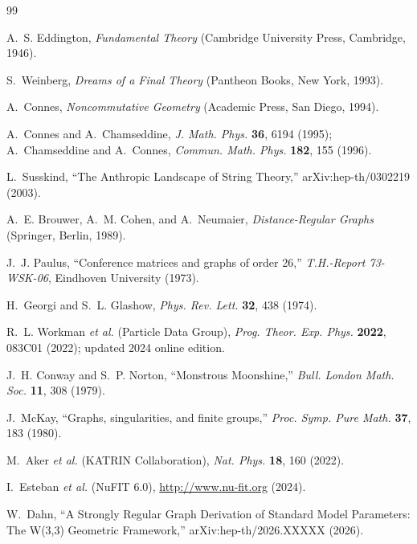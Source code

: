 \documentclass[aps,prl,twocolumn,showpacs,preprintnumbers,amsmath,amssymb]{revtex4-2}
\begin{document}
\begin{thebibliography}{99}

A.~S. Eddington,
\textit{Fundamental Theory}
(Cambridge University Press, Cambridge, 1946).

S.~Weinberg,
\textit{Dreams of a Final Theory}
(Pantheon Books, New York, 1993).

A.~Connes,
\textit{Noncommutative Geometry}
(Academic Press, San Diego, 1994).

A.~Connes and A.~Chamseddine,
\textit{J. Math. Phys.} \textbf{36}, 6194 (1995);
A.~Chamseddine and A.~Connes,
\textit{Commun. Math. Phys.} \textbf{182}, 155 (1996).

L.~Susskind,
``The Anthropic Landscape of String Theory,''
arXiv:hep-th/0302219 (2003).

A.~E. Brouwer, A.~M. Cohen, and A.~Neumaier,
\textit{Distance-Regular Graphs}
(Springer, Berlin, 1989).

J.~J. Paulus,
``Conference matrices and graphs of order 26,''
\textit{T.H.-Report 73-WSK-06}, Eindhoven University (1973).

H.~Georgi and S.~L. Glashow,
\textit{Phys. Rev. Lett.} \textbf{32}, 438 (1974).

R.~L. Workman \textit{et al.} (Particle Data Group),
\textit{Prog. Theor. Exp. Phys.} \textbf{2022}, 083C01 (2022);
updated 2024 online edition.

J.~H. Conway and S.~P. Norton,
``Monstrous Moonshine,''
\textit{Bull. London Math. Soc.} \textbf{11}, 308 (1979).

J.~McKay,
``Graphs, singularities, and finite groups,''
\textit{Proc. Symp. Pure Math.} \textbf{37}, 183 (1980).

M.~Aker \textit{et al.} (KATRIN Collaboration),
\textit{Nat. Phys.} \textbf{18}, 160 (2022).

I.~Esteban \textit{et al.} (NuFIT 6.0),
\url{http://www.nu-fit.org} (2024).

W.~Dahn,
``A Strongly Regular Graph Derivation of Standard Model Parameters:
The W(3,3) Geometric Framework,''
arXiv:hep-th/2026.XXXXX (2026).

\end{thebibliography}
\end{document}

